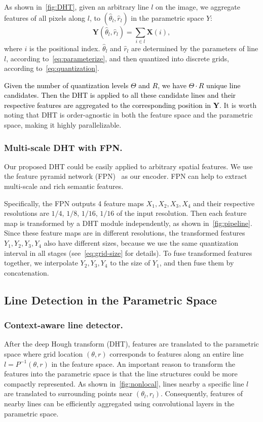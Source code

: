 \documentclass[10pt,journal,cspaper,compsoc]{IEEEtran}
\newcommand{\revise}[1]{{\textcolor{black}{#1}}}
\begin{document}
As shown in~\cref{fig:DHT},
given an arbitrary line $l$ on the image,
we aggregate features of all pixels along $l$,
to $(\hat{\theta}_l, \hat{r}_l)$ in the parametric space $Y$:
\begin{equation}
  \mathbf{Y}(\hat{\theta}_l, \hat{r}_l) = \sum_{i\in l} \mathbf{X}(i),
  \label{eq:dht}
\end{equation}
where $i$ is the positional index.
$\hat{\theta}_l$ and $\hat{r}_l$ are determined by the parameters of line $l$, according
to~\cref{eq:parameterize}, and then quantized into discrete grids, according to~\cref{eq:quantization}.

\revise{Given the number of quantization levels $\Theta$ and $R$,
we have $\Theta\cdot R$ unique line candidates.
Then the DHT is applied to all these candidate lines and their respective features
are aggregated to the corresponding position in $\mathbf{Y}$.}
It is worth noting that DHT is order-agnostic in both the feature space and the parametric space,
making it highly parallelizable.


\subsubsection{Multi-scale DHT with FPN.}\label{sec:ms-dht-fpn}
Our proposed DHT could be easily applied to arbitrary spatial features.
We use the feature pyramid network (FPN)~\cite{lin2017feature} as our encoder.
FPN can help to extract multi-scale and rich semantic features.


Specifically, the FPN outputs 4 feature maps $X_1, X_2, X_3, X_4$ and their respective
resolutions are $1/4$, $1/8$, $1/16$, $1/16$ of the input resolution.
Then each feature map is transformed by a DHT module independently, as shown in~\cref{fig:pipeline}.
Since these feature maps are in different resolutions, the transformed features
$Y_1, Y_2, Y_3, Y_4$ also have different sizes, because we use the same quantization
interval in all stages (see~\cref{eq:grid-size} for details).
To fuse transformed features together, we interpolate $Y_2, Y_3, Y_4$
to the size of $Y_1$, and then fuse them by concatenation.

\subsection{Line Detection in the Parametric Space}


\subsubsection{Context-aware line detector.}\label{sec:ctx-line-detector}
After the deep Hough transform (DHT), features are translated to the parametric space
where grid location $(\theta, r)$ corresponds to
features along an entire line $l=P^{-1}(\theta, r)$ in the feature space.
An important reason to transform the features into the parametric space 
is that the line structures could
be more compactly represented.
As shown in~\cref{fig:nonlocal},
lines nearby a specific line $l$ are translated to
surrounding points near $(\theta_l, r_l)$.
Consequently, features of nearby lines can be efficiently aggregated
using convolutional layers in the parametric space.
\end{document}
